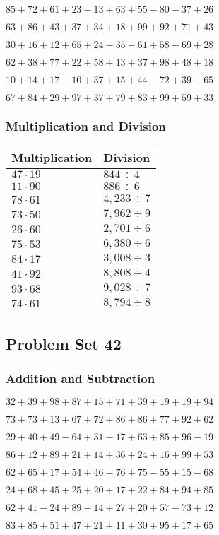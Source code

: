 \(85+72+61+23-13+63+55-80-37+26\)

\(63+86+43+37+34+18+99+92+71+43\)

\(30+16+12+65+24-35-61+58-69+28\)

\(62+38+77+22+58+13+37+98+48+18\)

\(10+14+17-10+37+15+44-72+39-65\)

\(67+84+29+97+37+79+83+99+59+33\)

\hypertarget{multiplication-and-division-81}{%
\subsubsection{Multiplication and
Division}\label{multiplication-and-division-81}}

\begin{longtable}[]{@{}ll@{}}
\toprule
Multiplication & Division\tabularnewline
\midrule
\endhead
\(47\cdot19\) & \(844÷4\)\tabularnewline
\(11\cdot90\) & \(886÷6\)\tabularnewline
\(78\cdot61\) & \(4,233÷7\)\tabularnewline
\(73\cdot50\) & \(7,962÷9\)\tabularnewline
\(26\cdot60\) & \(2,701÷6\)\tabularnewline
\(75\cdot53\) & \(6,380÷6\)\tabularnewline
\(84\cdot17\) & \(3,008÷3\)\tabularnewline
\(41\cdot92\) & \(8,808÷4\)\tabularnewline
\(93\cdot68\) & \(9,028÷7\)\tabularnewline
\(74\cdot61\) & \(8,794÷8\)\tabularnewline
\bottomrule
\end{longtable}

\hypertarget{problem-set-42}{%
\subsection{Problem Set 42}\label{problem-set-42}}

\hypertarget{addition-and-subtraction-82}{%
\subsubsection{Addition and
Subtraction}\label{addition-and-subtraction-82}}

\(32+39+98+87+15+71+39+19+19+ 94\)

\(73+73+13+67+72+86+86+77+92+62\)

\(29+40+49-64+31-17+63+85+96-19\)

\(86+12+89+21+14+36+24+16+99+53\)

\(62+65+17+54+46-76+75-55+15-68\)

\(24+68+45+25+20+17+22+84+94+85\)

\(62+41-24+89-14+27+20+57-73+12\)

\(83+85+51+47+21+11+30+95+17+65\)

